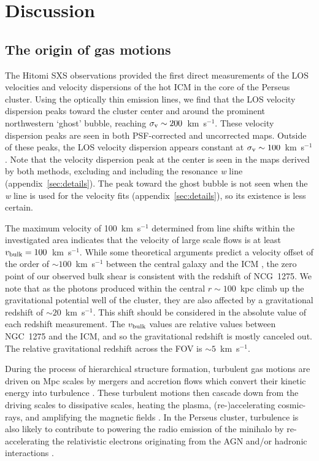 \section{Discussion}
\label{sec:discussion}

\subsection{The origin of gas motions}
\label{sec:origin}

The Hitomi SXS observations provided the first direct measurements of the LOS velocities and velocity dispersions of the hot ICM in the core of the Perseus cluster. Using the optically thin emission lines, we find that the LOS velocity dispersion peaks toward the cluster center and around the prominent northwestern `ghost' bubble, reaching $\sigma_{\rm v}\sim200$~km~s$^{-1}$. These velocity dispersion peaks are seen in both PSF-corrected and uncorrected maps. Outside of these peaks, the LOS velocity dispersion appears constant at $\sigma_{\rm v}\sim100$~km~s$^{-1}$. Note that the velocity dispersion peak at the center is seen in the maps derived by both methods, excluding and including the resonance {\it w} line (appendix~\ref{sec:details}). The peak toward the ghost bubble is not seen when the {\it w} line is used for the velocity fits (appendix~\ref{sec:details}), so its existence is less certain.

The maximum velocity of 100~km~s$^{-1}$ determined from line shifts within the investigated area indicates that the velocity of large scale flows is at least $v_{\rm bulk}=100$~km~s$^{-1}$. While some theoretical arguments predict a velocity offset of the order of $\sim100$~km~s$^{-1}$ between the central galaxy and the ICM \citep{inoue14}, the zero point of our observed bulk shear is consistent with the redshift of NCG~1275. We note that as the photons produced within the central $r\sim100$~kpc climb up the gravitational potential well of the cluster, they are also affected by a gravitational redshift of $\sim 20$~km~s$^{-1}$. This shift should be considered in the absolute value of each redshift measurement. The $v_{\rm bulk}$ values are relative values between NGC~1275 and the ICM, and so the gravitational redshift is mostly canceled out. The relative gravitational redshift across the FOV is $\sim 5$~km~s$^{-1}$.

During the process of hierarchical structure formation, turbulent gas motions are driven on Mpc scales by mergers and accretion flows which convert their kinetic energy into turbulence \citep[e.g.][]{bruggen2015}. These turbulent motions then cascade down from the driving scales to dissipative scales, heating the plasma, (re-)accelerating cosmic-rays, and amplifying the magnetic fields \citep[e.g.][]{brunetti2007,miniati2015}. In the Perseus cluster, turbulence is also likely to contribute to powering the radio emission of the minihalo \citep{burns92,sijbring93,walker2017} by re-accelerating the relativistic electrons originating from the AGN and/or hadronic interactions \citep[e.g.][]{gitti2002,ZuHone13}.

